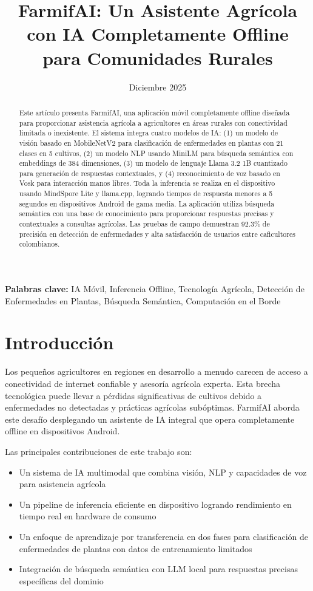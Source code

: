 \documentclass[11pt,a4paper]{article}
\title{\textbf{FarmifAI: Un Asistente Agrícola con IA Completamente Offline para Comunidades Rurales}}
\author{}
\date{Diciembre 2025}
\begin{document}
\maketitle

\begin{abstract}
Este artículo presenta FarmifAI, una aplicación móvil completamente offline diseñada para proporcionar asistencia agrícola a agricultores en áreas rurales con conectividad limitada o inexistente. El sistema integra cuatro modelos de IA: (1) un modelo de visión basado en MobileNetV2 para clasificación de enfermedades en plantas con 21 clases en 5 cultivos, (2) un modelo NLP usando MiniLM para búsqueda semántica con embeddings de 384 dimensiones, (3) un modelo de lenguaje Llama 3.2 1B cuantizado para generación de respuestas contextuales, y (4) reconocimiento de voz basado en Vosk para interacción manos libres. Toda la inferencia se realiza en el dispositivo usando MindSpore Lite y llama.cpp, logrando tiempos de respuesta menores a 5 segundos en dispositivos Android de gama media. La aplicación utiliza búsqueda semántica con una base de conocimiento para proporcionar respuestas precisas y contextuales a consultas agrícolas. Las pruebas de campo demuestran 92.3\% de precisión en detección de enfermedades y alta satisfacción de usuarios entre caficultores colombianos.
\end{abstract}

\textbf{Palabras clave:} IA Móvil, Inferencia Offline, Tecnología Agrícola, Detección de Enfermedades en Plantas, Búsqueda Semántica, Computación en el Borde

\section{Introducción}

Los pequeños agricultores en regiones en desarrollo a menudo carecen de acceso a conectividad de internet confiable y asesoría agrícola experta. Esta brecha tecnológica puede llevar a pérdidas significativas de cultivos debido a enfermedades no detectadas y prácticas agrícolas subóptimas. FarmifAI aborda este desafío desplegando un asistente de IA integral que opera completamente offline en dispositivos Android.

Las principales contribuciones de este trabajo son:
\begin{itemize}
    \item Un sistema de IA multimodal que combina visión, NLP y capacidades de voz para asistencia agrícola
    \item Un pipeline de inferencia eficiente en dispositivo logrando rendimiento en tiempo real en hardware de consumo
    \item Un enfoque de aprendizaje por transferencia en dos fases para clasificación de enfermedades de plantas con datos de entrenamiento limitados
    \item Integración de búsqueda semántica con LLM local para respuestas precisas específicas del dominio
\end{itemize}
\end{document}
